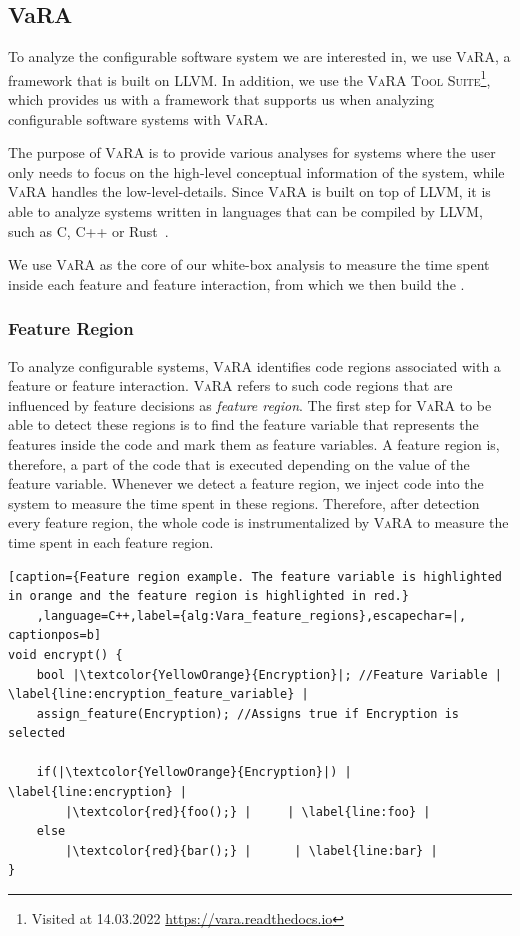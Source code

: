 \subsection{VaRA}\label{VaRA}
To analyze the configurable software system we are interested in, we use \textsc{VaRA}, 
a framework that is built on \textsc{LLVM}.
In addition, we use the \textsc{VaRA Tool Suite}\footnote{Visited at 14.03.2022 \url{https://vara.readthedocs.io}}, which provides us with a framework that supports
us when analyzing configurable software systems with \textsc{VaRA}.
    
The purpose of \textsc{VaRA} is to provide various analyses for systems where the user only needs to focus on the high-level conceptual information of the 
system, while \textsc{VaRA} handles the low-level-details. 
Since \textsc{VaRA} is built on top of \textsc{LLVM}, it is able to analyze systems written in languages that can be compiled by \textsc{LLVM}, such as C, C++ or Rust~\cite{VaRA-Flo}.

We use \textsc{VaRA} as the core of our white-box analysis to measure the time spent inside each feature and feature interaction, from which we then build the {\perfInfluenceModel}.  

\subsubsection{Feature Region}
To analyze configurable systems, \textsc{VaRA} identifies code regions associated with a feature or feature interaction.
\textsc{VaRA} refers to such code regions that are influenced by feature decisions as \emph{feature region}. 
The first step for \textsc{VaRA} to be able to detect these regions is to find the feature variable that represents the features inside the code and mark them as
feature variables. 
A feature region is, therefore, a part of the code that is executed depending on the value of the feature variable. Whenever we detect a feature region,
we inject code into the system to measure the time spent in these regions. Therefore, after detection every feature region, the whole code is instrumentalized
by \textsc{VaRA} to measure the time spent in each feature region. 

\lstset{style=myStyle}
\begin{minipage}{\linewidth}
\begin{lstlisting}[caption={Feature region example. The feature variable is highlighted in orange and the feature region is highlighted in red.}
    ,language=C++,label={alg:Vara_feature_regions},escapechar=|, captionpos=b]
void encrypt() {
    bool |\textcolor{YellowOrange}{Encryption}|; //Feature Variable | \label{line:encryption_feature_variable} |
    assign_feature(Encryption); //Assigns true if Encryption is selected
    
    if(|\textcolor{YellowOrange}{Encryption}|) | \label{line:encryption} |
        |\textcolor{red}{foo();} |     | \label{line:foo} |
    else
        |\textcolor{red}{bar();} |      | \label{line:bar} |
}
\end{lstlisting}
\end{minipage}

